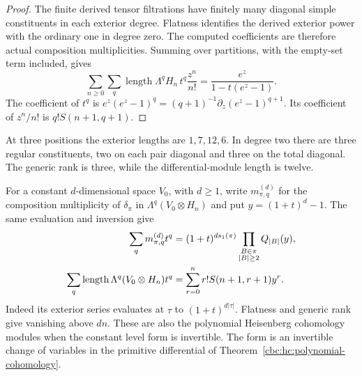 \begin{proof}
The finite derived tensor filtrations have finitely many
diagonal simple constituents in each exterior degree. Flatness
identifies the derived exterior power with the ordinary one in
degree zero. The computed coefficients are therefore actual
composition multiplicities. Summing over partitions, with the
empty-set term included, gives
\[
 \sum_{n\geq0}\sum_q
  \operatorname{length}\Lambda^qH_n\,t^q\frac{z^n}{n!}
     =\frac{e^z}{1-t(e^z-1)}.
\]
The coefficient of $t^q$ is
$e^z(e^z-1)^q=(q+1)^{-1}\partial_z(e^z-1)^{q+1}$.
Its coefficient of $z^n/n!$ is $q!S(n+1,q+1)$.
\end{proof}

At three positions the exterior lengths are $1,7,12,6$.
In degree two there are three regular constituents, two on
each pair diagonal and three on the total diagonal. The
generic rank is three, while the differential-module length
is twelve.

For a constant $d$-dimensional space $V_0$, with $d\geq1$,
write $m^{(d)}_{\pi,q}$ for the composition multiplicity of
$\delta_\pi$ in $\Lambda^q(V_0\otimes H_n)$ and put
$y=(1+t)^d-1$. The same evaluation and inversion give
\begin{align}
 \sum_qm^{(d)}_{\pi,q}t^q
   &=(1+t)^{d s_1(\pi)}
       \prod_{\substack{B\in\pi\\|B|\geq2}}Q_{|B|}(y),
                                      \label{cbc:ct:rank-multiplicity}\\
 \sum_q\operatorname{length}\Lambda^q(V_0\otimes H_n)t^q
   &=\sum_{r=0}^n r!S(n+1,r+1)y^r.\notag
\end{align}
Indeed its exterior series evaluates at $\tau$ to
$(1+t)^{d|\tau|}$. Flatness and generic rank give vanishing
above $dn$. These are also the polynomial Heisenberg
cohomology modules when the constant level form is invertible.
The form is an invertible change of variables in the primitive
differential of Theorem~\ref{cbc:hc:polynomial-cohomology}.

